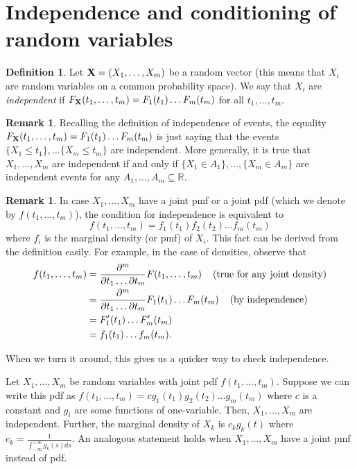 \documentclass[preprint,  11pt]{amsart}
\newcommand{\para}[1]{\vspace{4mm}\noindent{\bfseries #1:}}
\theoremstyle{plain} %
\theoremstyle{definition} %
\newtheorem{definition}[theorem]{Definition}
\newtheorem{remark}[theorem]{Remark}
\begin{document}
\section{Independence and conditioning of random variables}
\begin{definition} Let ${\bf X}=(X_{1},\ldots ,X_{m})$ be a random vector (this means that $X_{i}$ are random variables on a common probability space). We say that $X_{i}$ are {\em independent} if $F_{{\bf X}}(t_{1},\ldots ,t_{m})=F_{1}(t_{1})\ldots F_{m}(t_{m})$ for all $t_{1},\ldots ,t_{m}$. 
\end{definition}
\begin{remark} Recalling the definition of independence of events, the equality $F_{{\bf X}}(t_{1},\ldots ,t_{m})=F_{1}(t_{1})\ldots F_{m}(t_{m})$ is just saying that the events $\{X_{1}\le t_{1}\}, \ldots \{X_{m}\le t_{m}\}$ are independent. More generally, it is true that $X_{1},\ldots ,X_{m}$ are independent if and only if $\{X_{1}\in A_{1}\},\ldots ,\{X_{m}\in A_{m}\}$ are independent events for any $A_{1},\ldots, A_{m}\subseteq \mathbb{R}$.
\end{remark}

\begin{remark} In case $X_{1},\ldots ,X_{m}$ have a joint pmf or a joint pdf (which we denote by $f(t_{1},\ldots ,t_{m})$), the condition for independence is equivalent to 
$$
f(t_{1},\ldots ,t_{m})=f_{1}(t_{1})f_{2}(t_{2})\ldots f_{m}(t_{m})
$$ 
where $f_{i}$ is the marginal density (or pmf)  of $X_{i}$. This fact can be derived from the definition easily. For example, in the case of densities, observe that 
\begin{align*}
f(t_{1},\ldots ,t_{m}) &= \frac{\partial^{m}}{\partial t_{1}\ldots \partial t_{m}}F(t_{1},\ldots,t_{m}) \hspace{4mm}(\mbox{true for any joint density})\\
 &= \frac{\partial^{m}}{\partial t_{1}\ldots \partial t_{m}}F_{1}(t_{1})\ldots F_{m}(t_{m}) \hspace{4mm}(\mbox{by independence}) \\
 &= F_{1}'(t_{1})\ldots F_{m}'(t_{m}) \\
 &=f_{1}(t_{1})\ldots f_{m}(t_{m}).
\end{align*}
\end{remark}
When we turn it around, this gives us a quicker way to check independence.

\para{Fact} Let $X_{1},\ldots ,X_{m}$ be random variables with joint pdf $f(t_{1},\ldots ,t_{m})$. Suppose we can write this pdf as $f(t_{1},\ldots ,t_{m})=cg_{1}(t_{1})g_{2}(t_{2})\ldots g_{m}(t_{m})$ where $c$ is a constant and $g_{i}$ are some functions of one-variable. Then,  $X_{1},\ldots ,X_{m}$ are independent. Further, the marginal density of $X_{k}$ is $c_{k}g_{k}(t)$ where $c_{k}=\frac{1}{\int_{-\infty}^{+\infty}g_{k}(s)ds}$. An analogous statement holds when $X_{1},\ldots ,X_{m}$ have a joint pmf instead of pdf.
\end{document}
